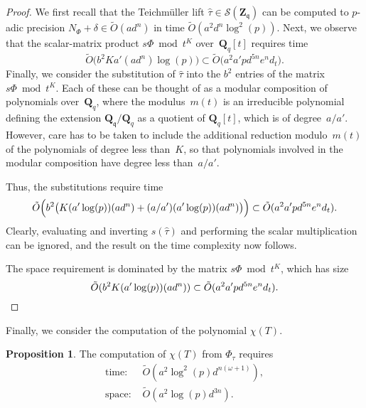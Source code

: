 \documentclass[a4paper,11pt]{article}
\numberwithin{equation}{section}
\newcommand{\ZZ}{\mathbf{Z}} %
\newcommand{\QQ}{\mathbf{Q}} %
\providecommand{\SoftOh}{\tilde{O}} %
\theoremstyle{definition}
\newtheorem{prop}[thm]{Proposition}
\begin{document}
\begin{proof}
We first recall that the Teichm\"uller lift 
$\hat{\tau} \in \mathcal{S}(\ZZ_{\mathfrak{q}})$ 
can be computed to $p$-adic precision $N_{\Phi}+\delta \in \SoftOh(a d^n)$ 
in time $\SoftOh(a^2 d^n \log^2(p))$.  Next, we observe that the 
scalar-matrix product $s \Phi \bmod t^K$ over~$\QQ_q[t]$ 
requires time 
\begin{equation*}
\SoftOh\bigl( b^2 K a' (a d^n) \log(p) \bigr) 
    \subset \SoftOh\bigl( a^2 a' p d^{5n} e^n d_t \bigr).
\end{equation*}
Finally, we consider the substitution of $\hat{\tau}$ 
into the $b^2$ entries of the matrix $s \Phi \bmod t^K$. 
Each of these can be thought of as a modular composition of polynomials 
over~$\QQ_{q}$, where the modulus~$m(t)$ is an irreducible polynomial defining 
the extension $\QQ_{\mathfrak{q}} / \QQ_{q}$ as a quotient of $\QQ_q[t]$, 
which is of degree~$a/a'$. However, care has to be taken to include the 
additional reduction modulo~$m(t)$ of the polynomials of degree less than~$K$, 
so that polynomials involved in the modular composition have degree less 
than~$a/a'$. 

Thus, the substitutions require time %
\begin{equation*}
\SoftOh\Bigl( b^2 \bigl(K (a' \log(p)) (a d^n) + (a/a') (a' \log(p)) (a d^n) \bigr) \Bigr)
    \subset \SoftOh(a^2 a' p d^{5n} e^n d_t).
\end{equation*}
Clearly, evaluating and inverting $s(\hat{\tau})$ and performing the 
scalar multiplication can be ignored, and the result on the time complexity now follows.

The space requirement is dominated by the matrix $s \Phi \bmod t^K$, 
which has size 
\begin{equation*}
\SoftOh(b^2 K (a' \log(p)) (a d^n)) \subset \SoftOh(a^2 a' p d^{5n} e^n d_t). 
\qedhere
\end{equation*}
\end{proof}

Finally, we consider the computation of the polynomial $\chi(T)$.

\begin{prop}
The computation of $\chi(T)$ from $\Phi_{\tau}$ requires
\begin{align*}
\mbox{time: }  & \SoftOh(a^2  \log^2(p) d^{n(\omega+1)}), \\
\mbox{space: } & \SoftOh(a^2 \log(p) d^{3n}).
\end{align*}
\end{prop}
\end{document}

